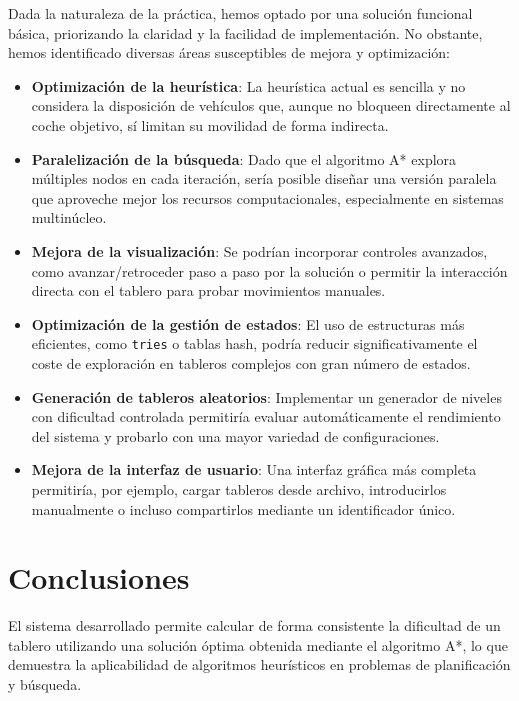 \documentclass{article}
\begin{document}
Dada la naturaleza de la práctica, hemos optado por una solución funcional básica, priorizando la claridad y la facilidad de implementación. No obstante, hemos identificado diversas áreas susceptibles de mejora y optimización:

\begin{itemize}
  \item \textbf{Optimización de la heurística}: La heurística actual es sencilla y no considera la disposición de vehículos que, aunque no bloqueen directamente al coche objetivo, sí limitan su movilidad de forma indirecta.
  
  \item \textbf{Paralelización de la búsqueda}: Dado que el algoritmo A* explora múltiples nodos en cada iteración, sería posible diseñar una versión paralela que aproveche mejor los recursos computacionales, especialmente en sistemas multinúcleo.
  
  \item \textbf{Mejora de la visualización}: Se podrían incorporar controles avanzados, como avanzar/retroceder paso a paso por la solución o permitir la interacción directa con el tablero para probar movimientos manuales.
  
  \item \textbf{Optimización de la gestión de estados}: El uso de estructuras más eficientes, como \texttt{tries} o tablas hash, podría reducir significativamente el coste de exploración en tableros complejos con gran número de estados.
  
  \item \textbf{Generación de tableros aleatorios}: Implementar un generador de niveles con dificultad controlada permitiría evaluar automáticamente el rendimiento del sistema y probarlo con una mayor variedad de configuraciones.
  
  \item \textbf{Mejora de la interfaz de usuario}: Una interfaz gráfica más completa permitiría, por ejemplo, cargar tableros desde archivo, introducirlos manualmente o incluso compartirlos mediante un identificador único.
\end{itemize}

\section{Conclusiones}

El sistema desarrollado permite calcular de forma consistente la dificultad de un tablero utilizando una solución óptima obtenida mediante el algoritmo A*, lo que demuestra la aplicabilidad de algoritmos heurísticos en problemas de planificación y búsqueda.\\
\end{document}
